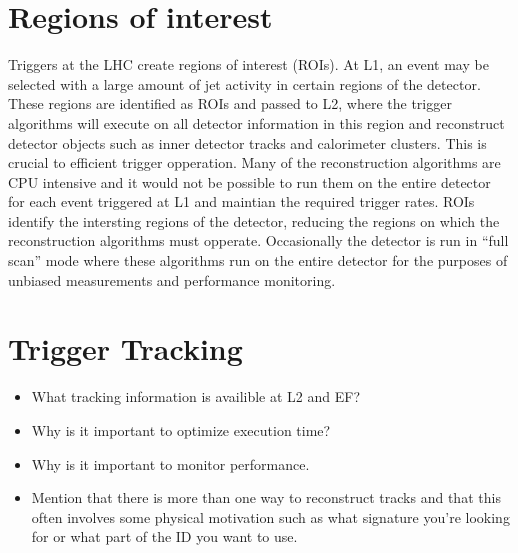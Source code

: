 \section{Regions of interest}
Triggers at the LHC create regions of interest (ROIs). At L1, an event may be selected with a large amount of jet activity in certain regions of the detector. These regions are identified as ROIs and passed to L2, where the trigger algorithms will execute on all detector information in this region and reconstruct detector objects such as inner detector tracks and calorimeter clusters. This is crucial to efficient trigger opperation. Many of the reconstruction algorithms are CPU intensive and it would not be possible to run them on the entire detector for each event triggered at L1 and maintian the required trigger rates. ROIs identify the intersting regions of the detector, reducing the regions on which the reconstruction algorithms must opperate. Occasionally the detector is run in ``full scan'' mode where these algorithms run on the entire detector for the purposes of unbiased measurements and performance monitoring.



\section{Trigger Tracking}
\label{sec:tracks}

\begin{itemize}
\item What tracking information is availible at L2 and EF?
\item Why is it important to optimize execution time?
\item Why is it important to monitor performance.
\item Mention that there is more than one way to reconstruct tracks and that this often involves some physical motivation such as what signature you're looking for or what part of the ID you want to use.
\end{itemize}

